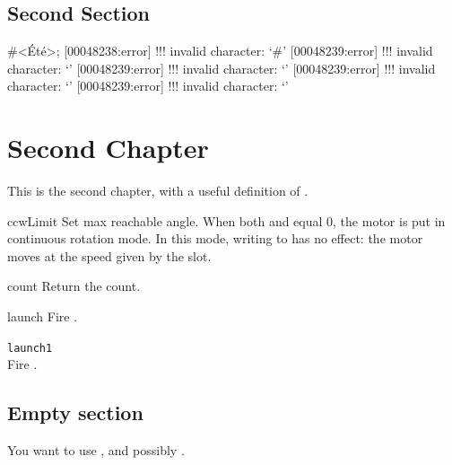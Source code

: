 \documentclass[openright,twoside,11pt]{book}
\begin{document}
\section{Second Section}


\begin{urbiunchecked}[escapeinside=<>]
#<Été>;
[00048238:error] !!! invalid character: `#'
[00048239:error] !!! invalid character: `'
[00048239:error] !!! invalid character: `'
[00048239:error] !!! invalid character: `'
[00048239:error] !!! invalid character: `'
\end{urbiunchecked}

\chapter{Second Chapter}

This is the second chapter, with a useful definition of
.




\begin{urbiscriptapi}
\item[ccwLimit]
  Set max reachable angle. When both  and
   equal 0, the motor is put in continuous rotation
  mode. In this mode, writing to  has no effect: the motor
  moves at the speed given by the  slot.


\item[count] Return the count.


\item[launch]
  Fire \this.


\item \lstinline|launch1|~\\
  Fire \this.
\end{urbiscriptapi}

\let\sectionOrig\section
\renewcommand{\section}[1]{\clearpage\sectionObject{#1}}
\sectionOrig{Empty section}


\let\section\sectionOrig

You want to use , and possibly .


\nocite{*}


\chapterIndex
\end{document}
